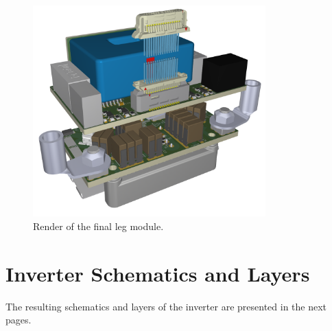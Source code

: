 \begin{figure}[H]
	\centering
	\includegraphics[width=0.8\textwidth]{Figures/Assembly.png}
	\caption{Render of the final leg module.}
	\label{fig:inverter_leg_render}
\end{figure}

\section{Inverter Schematics and Layers}

The resulting schematics and layers of the inverter are presented in the next pages.

\def\excerpt{\subsection{Half Bridge Board Schematic}\label{section:half_bridge_files}}

